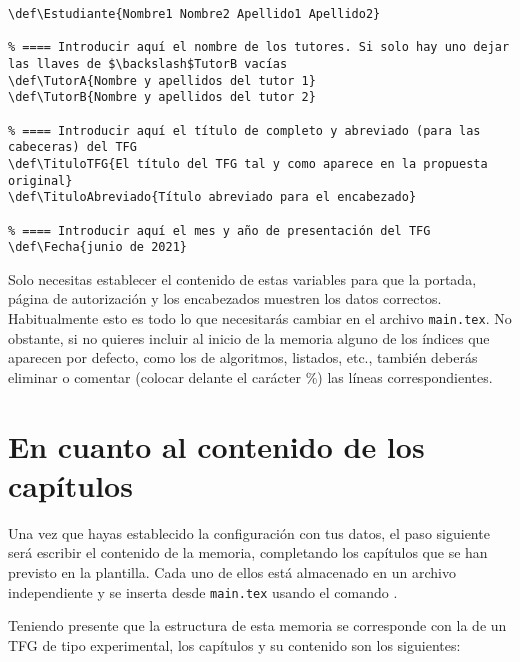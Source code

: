 \begin{lstlisting}[caption={Variables a establecer en \texttt{main.tex}},language={[LaTeX]TeX},label=List.Variables]
% ==== Introducir aquí el nombre del estudiante
\def\Estudiante{Nombre1 Nombre2 Apellido1 Apellido2}

% ==== Introducir aquí el nombre de los tutores. Si solo hay uno dejar las llaves de $\backslash$TutorB vacías
\def\TutorA{Nombre y apellidos del tutor 1}
\def\TutorB{Nombre y apellidos del tutor 2}

% ==== Introducir aquí el título de completo y abreviado (para las cabeceras) del TFG
\def\TituloTFG{El título del TFG tal y como aparece en la propuesta original}
\def\TituloAbreviado{Título abreviado para el encabezado}

% ==== Introducir aquí el mes y año de presentación del TFG
\def\Fecha{junio de 2021}
\end{lstlisting}

Solo necesitas establecer el contenido de estas variables para que la portada, página de autorización y los encabezados muestren los datos correctos. Habitualmente esto es todo lo que necesitarás cambiar en el archivo \texttt{main.tex}. No obstante, si no quieres incluir al inicio de la memoria alguno de los índices que aparecen por defecto, como los de algoritmos, listados, etc., también deberás eliminar o comentar (colocar delante el carácter \%) las líneas correspondientes.

\section{En cuanto al contenido de los capítulos}

Una vez que hayas establecido la configuración con tus datos, el paso siguiente será escribir el contenido de la memoria, completando los capítulos que se han previsto en la plantilla. Cada uno de ellos está almacenado en un archivo independiente y se inserta desde \texttt{main.tex} usando el comando \verb||. 

Teniendo presente que la estructura de esta memoria se corresponde con la de un TFG de tipo experimental, los capítulos y su contenido son los siguientes:

